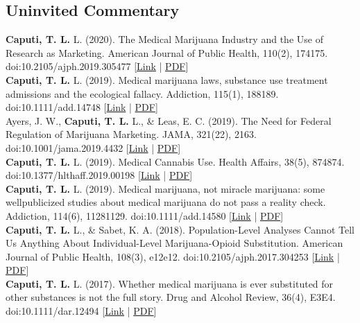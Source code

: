 \subsection*{Uninvited Commentary}\noindent
{}\textbf{\textbf{Caputi, T. L.}} L. (2020). The Medical Marijuana Industry and the Use of Research as Marketing. American Journal of Public Health, 110(2), 174175. doi:10.2105/ajph.2019.305477 [\href{https://ajph.aphapublications.org/doi/10.2105/AJPH.2019.305477}{Link} | \href{https://www.theodorecaputi.com/files/AJPH-2020.pdf}{PDF}] \\[.2cm]
\textbf{\textbf{Caputi, T. L.}} L. (2019). Medical marijuana laws, substance use treatment admissions and the ecological fallacy. Addiction, 115(1), 188189. doi:10.1111/add.14748 [\href{https://onlinelibrary.wiley.com/doi/full/10.1111/add.14748}{Link} | \href{https://www.theodorecaputi.com/files/ADD-2020.pdf}{PDF}] \\[.2cm]
Ayers, J. W., \textbf{\textbf{Caputi, T. L.}} L., & Leas, E. C. (2019). The Need for Federal Regulation of Marijuana Marketing. JAMA, 321(22), 2163. doi:10.1001/jama.2019.4432 [\href{https://jamanetwork.com/journals/jama/article-abstract/2734209}{Link} | \href{https://www.theodorecaputi.com/files/JAMA-2019.pdf}{PDF}] \\[.2cm]
\textbf{\textbf{Caputi, T. L.}} L. (2019). Medical Cannabis Use. Health Affairs, 38(5), 874874. doi:10.1377/hlthaff.2019.00198 [\href{https://www.healthaffairs.org/doi/10.1377/hlthaff.2019.00198}{Link} | \href{https://www.theodorecaputi.com/files/HA-2019.pdf}{PDF}] \\[.2cm]
\textbf{\textbf{Caputi, T. L.}} L. (2019). Medical marijuana, not miracle marijuana: some wellpublicized studies about medical marijuana do not pass a reality check. Addiction, 114(6), 11281129. doi:10.1111/add.14580 [\href{https://onlinelibrary.wiley.com/doi/full/10.1111/add.14580}{Link} | \href{https://www.theodorecaputi.com/files/ADD-2019.pdf}{PDF}] \\[.2cm]
\textbf{\textbf{Caputi, T. L.}} L., & Sabet, K. A. (2018). Population-Level Analyses Cannot Tell Us Anything About Individual-Level Marijuana-Opioid Substitution. American Journal of Public Health, 108(3), e12e12. doi:10.2105/ajph.2017.304253 [\href{https://ajph.aphapublications.org/doi/10.2105/AJPH.2017.304253}{Link} | \href{https://www.theodorecaputi.com/files/AJPH_letter-2018.pdf}{PDF}] \\[.2cm]
\textbf{\textbf{Caputi, T. L.}} L. (2017). Whether medical marijuana is ever substituted for other substances is not the full story. Drug and Alcohol Review, 36(4), E3E4. doi:10.1111/dar.12494 [\href{https://onlinelibrary.wiley.com/doi/abs/10.1111/dar.12494}{Link} | \href{https://www.theodorecaputi.com/files/DAR-2017.pdf}{PDF}] \\[.2cm]
